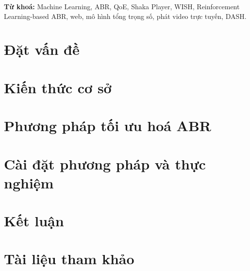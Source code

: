 \documentclass[12pt]{report}
\begin{document}
\textbf{Từ khoá:} Machine Learning, ABR, QoE, Shaka Player, WISH, Reinforcement Learning-based ABR, web, mô hình tổng trọng số, phát video trực tuyến, DASH.

\tableofcontents





\chapter{Đặt vấn đề}
% 

\chapter{Kiến thức cơ sở}
% 

\chapter{Phương pháp tối ưu hoá ABR}
% 

\chapter{Cài đặt phương pháp và thực nghiệm}
% 

\chapter{Kết luận}
% 

\chapter*{Tài liệu tham khảo}
% 

\end{document}
